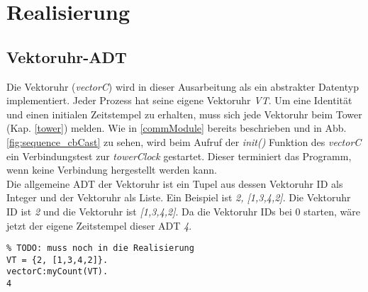 \section{Realisierung}


\subsection{Vektoruhr-ADT}

Die Vektoruhr (\textit{vectorC}) wird in dieser Ausarbeitung als ein abstrakter Datentyp implementiert. Jeder Prozess hat seine eigene Vektoruhr \textit{VT}. Um eine Identität und einen initialen Zeitstempel zu erhalten, muss sich jede Vektoruhr beim Tower (Kap. \ref{tower}) melden.
Wie in \ref{commModule} bereits beschrieben und in Abb. \ref{fig:sequence_cbCast} zu sehen, wird beim Aufruf der \textit{init()} Funktion des \textit{vectorC} ein Verbindungstest zur \textit{towerClock} gestartet. Dieser terminiert das Programm, wenn keine Verbindung hergestellt werden kann.
\\Die allgemeine ADT der Vektoruhr ist ein Tupel aus dessen Vektoruhr ID als Integer und der Vektoruhr als Liste. Ein Beispiel ist \textit{{2, [1,3,4,2]}}. Die Vektoruhr ID ist \textit{2} und die Vektoruhr ist \textit{[1,3,4,2]}. Da die Vektoruhr IDs bei 0 starten, wäre jetzt der eigene Zeitstempel dieser ADT \textit{4}.

\begin{lstlisting}
% TODO: muss noch in die Realisierung
VT = {2, [1,3,4,2]}.
vectorC:myCount(VT).
4
\end{lstlisting}